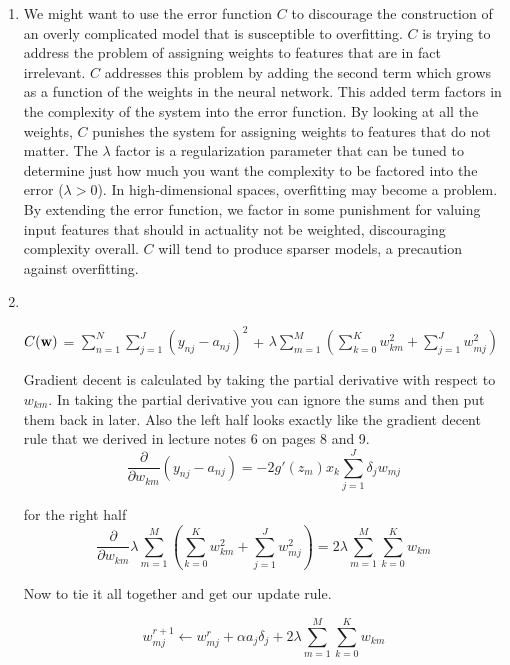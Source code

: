 \documentclass[solution, letterpaper]{cs121}
\begin{document}
\problem{}
\begin{enumerate}
	\item We might want to use the error function $C$ to discourage the construction of an overly complicated model that is susceptible to overfitting. $C$ is trying to address the problem of assigning weights to features that are in fact irrelevant. $C$ addresses this problem by adding the second term which grows as a function of the weights in the neural network. This added term factors in the complexity of the system into the error function. By looking at all the weights, $C$ punishes the system for assigning weights to features that do not matter. The $\lambda$ factor is a regularization parameter that can be tuned to determine just how much you want the complexity to be factored into the error ($\lambda > 0$). In high-dimensional spaces, overfitting may become a problem. By extending the error function, we factor in some punishment for valuing input features that should in actuality not be weighted, discouraging complexity overall. $C$ will tend to produce sparser models, a precaution against overfitting. 
	\item \hfill \\
\begin{center}
	$C({\bf w})$ = $\displaystyle\sum\limits_{n=1}^N \displaystyle\sum\limits_{j=1}^J (y_{nj} - a_{nj})^2$ +  $\lambda \displaystyle\sum\limits_{m=1}^M 
	\left(\displaystyle\sum\limits_{k=0}^K  w_{km}^2 +
	\displaystyle\sum\limits_{j=1}^J w_{mj}^2\right)$
\end{center}	
	Gradient decent is calculated by taking the partial derivative with respect to $w_{km}$. In taking the partial derivative you can ignore the sums and then put them back in later. Also the left half looks exactly like the gradient decent rule that we derived in lecture notes 6 on pages 8 and 9.
	\[ \frac{\partial }{\partial w_{km}} (y_{nj} - a_{nj}) = -2g'(z_{m})x_k \displaystyle\sum\limits_{j=1}^J \delta_j w_{mj} \]

for the right half
\[ \frac{\partial }{\partial w_{km}} \lambda \displaystyle\sum\limits_{m=1}^M  \left(\displaystyle\sum\limits_{k=0}^K  w_{km}^2 + \displaystyle\sum\limits_{j=1}^J w_{mj}^2\right) = 2\lambda\displaystyle\sum\limits_{m=1}^M \displaystyle\sum\limits_{k=0}^Kw_{km} \]

Now to tie it all together and get our update rule.

\[ w_{mj}^{r+1} \leftarrow w_{mj}^{r} + \alpha a_j \delta_j  + 2\lambda \displaystyle\sum\limits_{m=1}^M \displaystyle\sum\limits_{k=0}^Kw_{km} \]


\end{enumerate}
\end{document}
